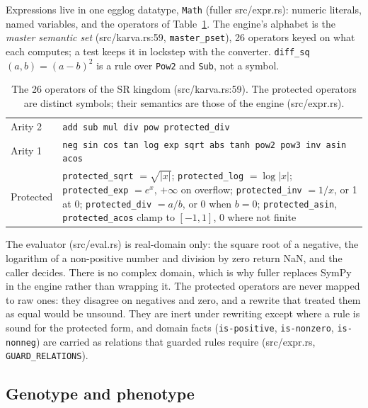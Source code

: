\documentclass[sigconf,nonacm]{acmart}
\newcommand{\src}[1]{{\small\ttfamily #1}}
\begin{document}
Expressions live in one egglog datatype, \texttt{Math}
(\src{fuller src/\allowbreak{}expr.\allowbreak{}rs}): numeric literals, named variables, and the
operators of Table~\ref{tab:ops}. The engine's alphabet is the
\emph{master semantic set} (\src{src/\allowbreak{}karva.\allowbreak{}rs:59}, \texttt{master\_pset}), 26
operators keyed on what each computes; a test keeps it in lockstep with the
converter. \texttt{diff\_sq}$(a,b)=(a-b)^2$ is a rule over \texttt{Pow2} and
\texttt{Sub}, not a symbol.

\begin{table}[t]
\caption{The 26 operators of the SR kingdom (\src{src/\allowbreak{}karva.\allowbreak{}rs:59}). The
protected operators are distinct symbols; their semantics are those of the
engine (\src{src/\allowbreak{}expr.\allowbreak{}rs}).}
\label{tab:ops}
\small
\begin{tabular}{@{}lp{}@{}}
\toprule
Arity 2 & \texttt{add sub mul div pow protected\_div} \\
Arity 1 & \texttt{neg sin cos tan log exp sqrt abs tanh pow2 pow3 inv asin acos} \\
Protected & \texttt{protected\_sqrt} $=\sqrt{|x|}$; \texttt{protected\_log} $=\log|x|$;
\texttt{protected\_exp} $=e^x$, $+\infty$ on overflow; \texttt{protected\_inv}
$=1/x$, or 1 at 0; \texttt{protected\_div} $=a/b$, or 0 when $b=0$;
\texttt{protected\_asin}, \texttt{protected\_acos} clamp to $[-1,1]$, 0 where
not finite \\
\bottomrule
\end{tabular}
\end{table}

The evaluator (\src{src/\allowbreak{}eval.\allowbreak{}rs}) is real-domain only: the square root of a
negative, the logarithm of a non-positive number and division by zero return
NaN, and the caller decides. There is no complex domain, which is why fuller
replaces SymPy in the engine rather than wrapping it. The protected operators
are never mapped to raw ones: they disagree on negatives and zero, and a rewrite
that treated them as equal would be unsound. They are inert under rewriting
except where a rule is sound for the protected form, and domain facts
(\texttt{is-positive}, \texttt{is-nonzero}, \texttt{is-nonneg}) are carried as
relations that guarded rules require (\src{src/\allowbreak{}expr.\allowbreak{}rs},
\texttt{GUARD\_RELATIONS}).

\subsection{Genotype and phenotype}
\end{document}
